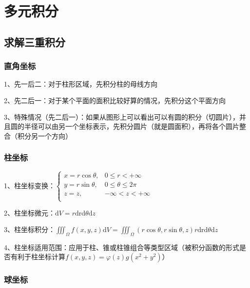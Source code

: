 \chapter{多元积分}

\section{求解三重积分}



\subsection{直角坐标}

1、先一后二：对于柱形区域，先积分柱的母线方向

2、先二后一：对于某个平面的面积比较好算的情况，先积分这个平面方向

3、特殊情况（先二后一）：如果从图形上可以看出可以有圆的积分（切圆片），并且圆的半径可以由另一个坐标表示，先积分圆片（就是圆面积），再将各个圆片整合（积分另一个方向）



\subsection{柱坐标}

1、柱坐标变换：$\begin{cases} x=r \cos \theta, & 0 \leqslant r < +\infty \\ y=r \sin \theta,& 0 \leqslant \theta \leqslant 2 \pi \\ z=z, &  -\infty<z<+\infty \\ \end{cases}$

2、柱坐标微元：$\mathrm{d} V=r \mathrm{drd} \theta \mathrm{d} z$

3、柱坐标积分：$\iiint_{\Omega} f(x, y, z) \mathrm{d} V=\iiint_{\Omega}(r \cos \theta, r \sin \theta, z) r \mathrm{drd} \theta \mathrm{d} z$

4、柱坐标适用范围：应用于柱、锥或柱锥组合等类型区域（被积分函数的形式是否有利于柱坐标计算$f(x, y, z)=\varphi(z) g\left(x^{2}+y^{2}\right)$）



\subsection{球坐标}

